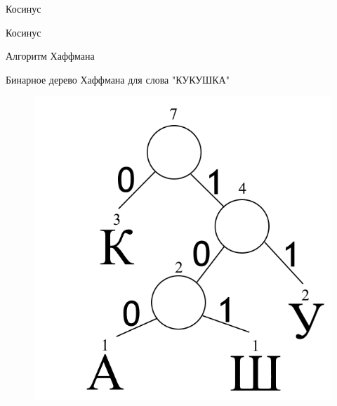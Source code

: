 \documentclass[11pt]{beamer}
\begin{document}
\begin{frame}{Косинус}
\begin{block}{Косинус}
\begin{figure}[H]
	\begin{center}
	\end{center}
\end{figure}	
\end{block}				
\end{frame}



\begin{frame}{Алгоритм Хаффмана}
\begin{block}{Бинарное дерево Хаффмана для слова "КУКУШКА"}
\begin{figure}[H]
	\begin{center}
		\includegraphics[scale=0.42]{../pics/Huffman/huffman.png}
	\end{center}
\end{figure}	
\end{block}				
\end{frame}
\end{document}
